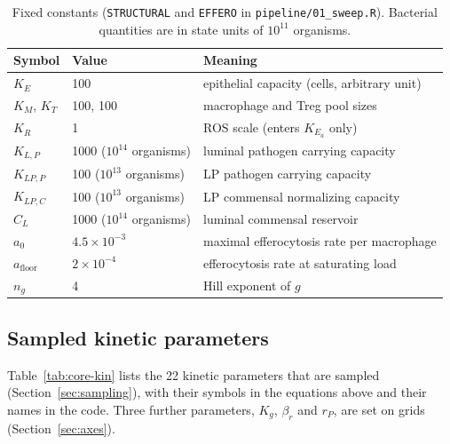\documentclass[11pt]{article}
\newcommand{\bros}{\beta_r}
\begin{document}
\begin{table}[H]
\centering
\caption{Fixed constants (\texttt{STRUCTURAL} and \texttt{EFFERO} in
\texttt{pipeline/01\_sweep.R}). Bacterial quantities are in state units of
$10^{11}$ organisms.}
\label{tab:core-const}
\begin{tabular}{lll}
\toprule
Symbol & Value & Meaning\\\midrule
$K_E$ & 100 & epithelial capacity (cells, arbitrary unit)\\
$K_M$, $K_T$ & 100, 100 & macrophage and Treg pool sizes\\
$K_R$ & 1 & ROS scale (enters $K_{E_a}$ only)\\
$K_{L,P}$ & 1000 ($10^{14}$ organisms) & luminal pathogen carrying capacity\\
$K_{LP,P}$ & 100 ($10^{13}$ organisms) & LP pathogen carrying capacity\\
$K_{LP,C}$ & 100 ($10^{13}$ organisms) & LP commensal normalizing capacity\\
$C_L$ & 1000 ($10^{14}$ organisms) & luminal commensal reservoir\\
$a_0$ & $4.5\times10^{-3}$ & maximal efferocytosis rate per macrophage\\
$a_{\mathrm{floor}}$ & $2\times10^{-4}$ & efferocytosis rate at saturating load\\
$n_g$ & 4 & Hill exponent of $g$\\
\bottomrule
\end{tabular}
\end{table}

\subsection{Sampled kinetic parameters}
\label{sec:kin-table}

Table~\ref{tab:core-kin} lists the 22 kinetic parameters that are sampled (Section~\ref{sec:sampling}), with their symbols in the equations above and their names in the code. Three further parameters, $K_g$, $\bros$ and $r_P$, are set on grids (Section~\ref{sec:axes}).
\end{document}
